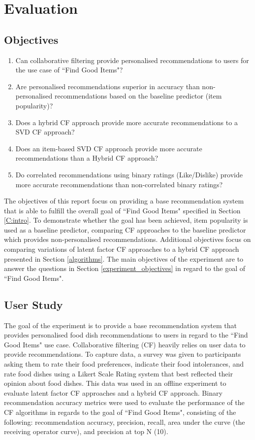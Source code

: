 \chapter{Evaluation}\label{C:evaluation}

\section{Objectives}
\begin{enumerate} \label{experiment_objectives}
	\item{Can collaborative filtering provide personalised recommendations to users for the use case of ``Find Good Items"?}
	\item{Are personalised recommendations superior in accuracy than non-personalised recommendations based on the baseline predictor (item popularity)?}
	\item{Does a hybrid CF approach provide more accurate recommendations to a SVD CF approach?}
	\item{Does an item-based SVD CF approach provide more accurate recommendations than a Hybrid CF approach?}
	\item{Do correlated recommendations using binary ratings (Like/Dislike) provide more accurate recommendations than non-correlated binary ratings?}
\end{enumerate}

The objectives of this report focus on providing a base recommendation system that is able to fulfill the overall goal of ``Find Good Items" specified in Section \ref{C:intro}. To demonstrate whether the goal has been achieved, item popularity is used as a baseline predictor, comparing CF approaches to the baseline predictor which provides non-personalised recommendations. Additional objectives focus on comparing variations of latent factor CF approaches to a hybrid CF approach presented in Section \ref{algorithms}. The main objectives of the experiment are to answer the questions in Section \ref{experiment_objectives} in regard to the goal of ``Find Good Items".

\section{User Study}

The goal of the experiment is to provide a base recommendation system that provides personalised food dish recommendations to users in regard to the ``Find Good Items" use case. Collaborative filtering (CF) heavily relies on user data to provide recommendations. To capture data, a survey was given to participants asking them to rate their food preferences, indicate their food intolerances, and rate food dishes using a Likert Scale Rating system that best reflected their opinion about food dishes. This data was used in an offline experiment to evaluate latent factor CF approaches and a hybrid CF approach. Binary recommendation accuracy metrics were used to evaluate the performance of the CF algorithms in regards to the goal of ``Find Good Items", consisting of the following: recommendation accuracy, precision, recall, area under the curve (the receiving operator curve), and precision at top N (10). 

